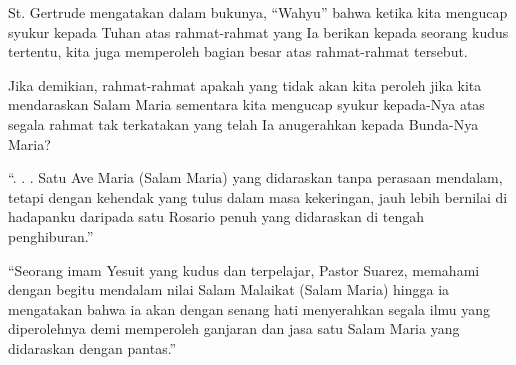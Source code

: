 St. Gertrude mengatakan dalam bukunya, “Wahyu” bahwa ketika kita mengucap syukur kepada Tuhan atas rahmat-rahmat yang Ia berikan kepada seorang kudus tertentu, kita juga memperoleh bagian besar atas rahmat-rahmat tersebut.


\small
Jika demikian, rahmat-rahmat apakah yang tidak akan kita peroleh jika kita mendaraskan Salam Maria sementara kita mengucap syukur kepada-Nya atas segala rahmat tak terkatakan yang telah Ia anugerahkan kepada Bunda-Nya Maria?


 
“. . . Satu Ave Maria (Salam Maria) yang didaraskan tanpa perasaan mendalam, tetapi dengan kehendak yang tulus dalam masa kekeringan, jauh lebih bernilai di hadapanku daripada satu Rosario penuh yang didaraskan di tengah penghiburan.”
 

 
“Seorang imam Yesuit yang kudus dan terpelajar, Pastor Suarez, memahami dengan begitu mendalam nilai Salam Malaikat (Salam Maria) hingga ia mengatakan bahwa ia akan dengan senang hati menyerahkan segala ilmu yang diperolehnya demi memperoleh ganjaran dan jasa satu Salam Maria yang didaraskan dengan pantas.”
 
\normalsize